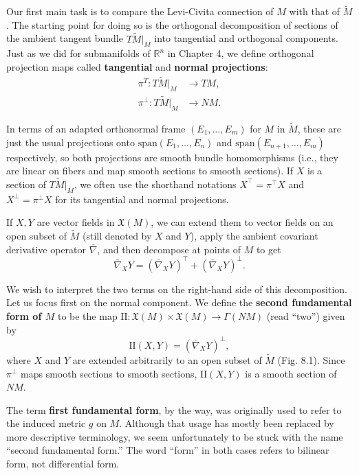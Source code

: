 Our first main task is to compare the Levi-Civita connection of $M$ with that of $\tilde{M}$. The starting point for doing so is the orthogonal decomposition of sections of the ambient tangent bundle $T\tilde{M}|_M$ into tangential and orthogonal components. Just as we did for submanifolds of $\mathbb{R}^n$ in Chapter 4, we define orthogonal projection maps called \textbf{tangential} and \textbf{normal projections}:
\begin{align*}
\pi^T : T\tilde{M}|_M &\to TM, \\
\pi^\perp : T\tilde{M}|_M &\to NM.
\end{align*}

In terms of an adapted orthonormal frame $(E_1, \ldots, E_m)$ for $M$ in $\tilde{M}$, these are just the usual projections onto $\text{span}(E_1, \ldots, E_n)$ and $\text{span}(E_{n+1}, \ldots, E_m)$ respectively, so both projections are smooth bundle homomorphisms (i.e., they are linear on fibers and map smooth sections to smooth sections). If $X$ is a section of $T\tilde{M}|_M$, we often use the shorthand notations $X^{\top} = \pi^{\top} X$ and $X^{\perp} = \pi^{\perp} X$ for its tangential and normal projections.


If $X, Y$ are vector fields in $\mathfrak{X}(M)$, we can extend them to vector fields on an open subset of $\tilde{M}$ (still denoted by $X$ and $Y$), apply the ambient covariant derivative operator $\bar{\nabla}$, and then decompose at points of $M$ to get
\begin{equation}
\bar{\nabla}_X Y = (\bar{\nabla}_X Y)^{\top} + (\bar{\nabla}_X Y)^{\perp}.
\tag{8.1}
\end{equation}

We wish to interpret the two terms on the right-hand side of this decomposition. Let us focus first on the normal component. We define the \textbf{second fundamental form of $M$} to be the map $\text{II}: \mathfrak{X}(M) \times \mathfrak{X}(M) \to \Gamma(NM)$ (read ``two'') given by
\[
\text{II}(X, Y) = (\bar{\nabla}_X Y)^{\perp},
\]
where $X$ and $Y$ are extended arbitrarily to an open subset of $\tilde{M}$ (Fig. 8.1). Since $\pi^{\perp}$ maps smooth sections to smooth sections, $\text{II}(X, Y)$ is a smooth section of $NM$.

The term \textbf{first fundamental form}, by the way, was originally used to refer to the induced metric $g$ on $M$. Although that usage has mostly been replaced by more descriptive terminology, we seem unfortunately to be stuck with the name ``second fundamental form.'' The word ``form'' in both cases refers to bilinear form, not differential form.

